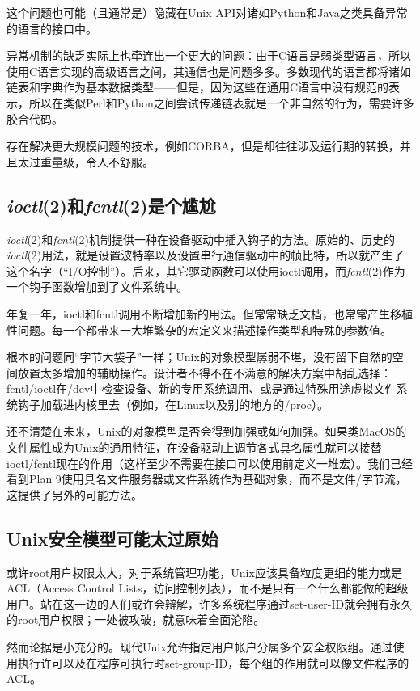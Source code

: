 \documentclass[12pt,oneside]{ctexbook}
\begin{document}
\begin{common-format}
这个问题也可能（且通常是）隐藏在Unix API对诸如Python和Java之类具备异常的语言的接口中。

异常机制的缺乏实际上也牵连出一个更大的问题：由于C语言是弱类型语言，所以使用C语言实现的高级语言之间，其通信也是问题多多。多数现代的语言都将诸如链表和字典作为基本数据类型——但是，因为这些在通用C语言中没有规范的表示，所以在类似Perl和Python之间尝试传递链表就是一个非自然的行为，需要许多胶合代码。

存在解决更大规模问题的技术，例如CORBA，但是却往往涉及运行期的转换，并且太过重量级，令人不舒服。

\subsection{\textit{ioctl}(2)和\textit{fcntl}(2)是个尴尬}
\textit{ioctl}(2)和\textit{fcntl}(2)机制提供一种在设备驱动中插入钩子的方法。原始的、历史的\textit{ioctl}(2)用法，就是设置波特率以及设置串行通信驱动中的帧比特，所以就产生了这个名字（“I/O控制”）。后来，其它驱动函数可以使用ioctl调用，而\textit{fcntl}(2)作为一个钩子函数增加到了文件系统中。

年复一年，ioctl和fcntl调用不断增加新的用法。但常常缺乏文档，也常常产生移植性问题。每一个都带来一大堆繁杂的宏定义来描述操作类型和特殊的参数值。

根本的问题同“字节大袋子”一样；Unix的对象模型孱弱不堪，没有留下自然的空间放置太多增加的辅助操作。设计者不得不在不满意的解决方案中胡乱选择：fcntl/ioctl在/dev中检查设备、新的专用系统调用、或是通过特殊用途虚拟文件系统钩子加载进内核里去（例如，在Linux以及别的地方的/proc）。

还不清楚在未来，Unix的对象模型是否会得到加强或如何加强。如果类MacOS的文件属性成为Unix的通用特征，在设备驱动上调节各式具名属性就可以接替ioctl/fcntl现在的作用（这样至少不需要在接口可以使用前定义一堆宏）。我们已经看到Plan 9使用具名文件服务器或文件系统作为基础对象，而不是文件/字节流，这提供了另外的可能方法。

\subsection{Unix安全模型可能太过原始}
或许root用户权限太大，对于系统管理功能，Unix应该具备粒度更细的能力或是ACL（Access Control Lists，访问控制列表），而不是只有一个什么都能做的超级用户。站在这一边的人们或许会辩解，许多系统程序通过set-user-ID就会拥有永久的root用户权限；一处被攻破，就意味着全面沦陷。

然而论据是小充分的。现代Unix允许指定用户帐户分属多个安全权限组。通过使用执行许可以及在程序可执行时set-group-ID，每个组的作用就可以像文件程序的ACL。


\end{common-format}
\end{document}
